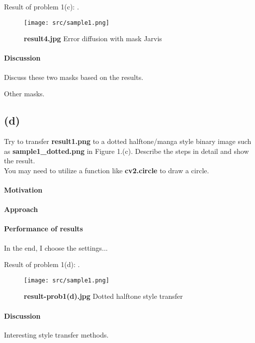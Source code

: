 Result of problem 1(c): .
\begin{figure}
    \centering
    \texttt{[image: src/sample1.png]}
    \caption{\textbf{result4.jpg} Error diffusion with mask Jarvis}
    \label{result4}
\end{figure}

\paragraph{Discussion}
Discuss these two masks based on the results.

Other masks.

\subsection{(d)}\label{1_d}
Try to transfer \textbf{result1.png} to a dotted halftone/manga style binary image such as \textbf{sample1\_dotted.png} in Figure 1.(c). Describe the steps in detail and show the result. \\
You may need to utilize a function like \textbf{cv2.circle} to draw a circle.

\paragraph{Motivation}

\paragraph{Approach}

\paragraph{Performance of results}
In the end, I choose the \alert{settings}...

Result of problem 1(d): .
\begin{figure}
    \centering
    \texttt{[image: src/sample1.png]}
    \caption{\textbf{result-prob1(d).jpg} Dotted halftone style transfer}
    \label{result-prob1(d)}
\end{figure}

\paragraph{Discussion}
Interesting style transfer methods.

